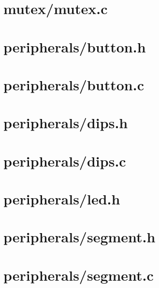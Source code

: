 \section{mutex/mutex.c} \label{sec:mutex.c}



\section{peripherals/button.h} \label{sec:button.h}


\section{peripherals/button.c} \label{sec:button.c}


\section{peripherals/dips.h} \label{sec:dips.h}


\section{peripherals/dips.c} \label{sec:dips.c}


\section{peripherals/led.h} \label{sec:led.h}


\section{peripherals/segment.h} \label{sec:segment.h}


\section{peripherals/segment.c} \label{sec:segment.c}


